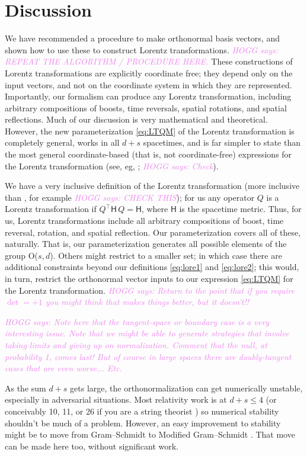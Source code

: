 \documentclass{article}
\newcommand{\metric}{\mathsf{H}}
\newcommand{\HOGG}[1]{\textcolor{violet}{\textsl{HOGG says: {#1}}}}
\begin{document}
\section{Discussion}\label{sec:discussion}

We have recommended a procedure to make orthonormal basis vectors, and shown how to use these to construct Lorentz transformations.
\HOGG{REPEAT THE ALGORITHM / PROCEDURE HERE.}
These constructions of Lorentz transformations are explicitly coordinate free; they depend only on the input vectors, and not on the coordinate system in which they are represented.
Importantly, our formalism can produce any Lorentz transformation, including arbitrary compositions of boosts, time reversals, spatial rotations, and spatial reflections.
Much of our discussion is very mathematical and theoretical.
However, the new parameterization \eqref{eq:LTQM} of the Lorentz transformation is completely general, works in all $d+s$ spacetimes, and is far simpler to state than the most general coordinate-based (that is, not coordinate-free) expressions for the Lorentz transformation (see, eg, \cite{haber}; \HOGG{Check}).

We have a very inclusive definition of the Lorentz transformation (more inclusive than \cite{haber}, for example \HOGG{CHECK THIS}); for us any operator $Q$ is a Lorentz transformation if $Q^\top\metric\,Q=\metric$, where $\metric$ is the spacetime metric.
Thus, for us, Lorentz transformations include all arbitrary compositions of boost, time reversal, rotation, and spatial reflection.
Our parameterization covers all of these, naturally.
That is, our parameterization generates all possible elements of the group O($s,d$).
Others might restrict to a smaller set; in which case there are additional constraints beyond our definitions \eqref{eq:lore1} and \eqref{eq:lore2}; this would, in turn, restrict the orthonormal vector inputs to our expression \eqref{eq:LTQM} for the Lorentz transformation.
\HOGG{Return to the point that if you require $\det=+1$ you might think that makes things better, but it doesn't!!}

\HOGG{Note here that the tangent-space or boundary case is a very interesting issue. Note that we might be able to generate strategies that involve taking limits and giving up on normalization. Comment that the null, at probability 1, comes last! But of course in large spaces there are doubly-tangent cases that are even worse... Etc.}

As the sum $d+s$ gets large, the orthonormalization can get numerically unstable, especially in adversarial situations.
Most relativity work is at $d+s\leq 4$ (or conceivably 10, 11, or 26 if you are a string theorist \cite{strings}) so numerical stability shouldn't be much of a problem.
However, an easy improvement to stability might be to move from Gram--Schmidt to Modified Gram--Schmidt \cite{modifiedgramschmidt}.
That move can be made here too, without significant work.
\end{document}
